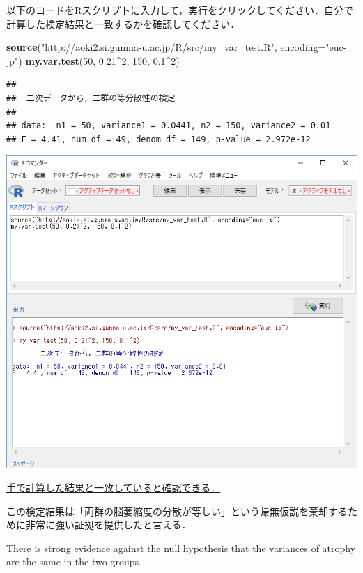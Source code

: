 \documentclass[]{problemset}
\newenvironment{Shaded}{\begin{snugshade}}{\end{snugshade}}
\newcommand{\DataTypeTok}[1]{\textcolor[rgb]{0.13,0.29,0.53}{#1}}
\newcommand{\DecValTok}[1]{\textcolor[rgb]{0.00,0.00,0.81}{#1}}
\newcommand{\FloatTok}[1]{\textcolor[rgb]{0.00,0.00,0.81}{#1}}
\newcommand{\KeywordTok}[1]{\textcolor[rgb]{0.13,0.29,0.53}{\textbf{#1}}}
\newcommand{\NormalTok}[1]{#1}
\newcommand{\OperatorTok}[1]{\textcolor[rgb]{0.81,0.36,0.00}{\textbf{#1}}}
\newcommand{\StringTok}[1]{\textcolor[rgb]{0.31,0.60,0.02}{#1}}
\begin{document}
以下のコードをRスクリプトに入力して，実行をクリックしてください．自分で計算した検定結果と一致するかを確認してください．

\begin{Shaded}
\begin{Highlighting}[]
\KeywordTok{source}\NormalTok{(}\StringTok{"http://aoki2.si.gunma-u.ac.jp/R/src/my_var_test.R"}\NormalTok{, }\DataTypeTok{encoding=}\StringTok{"euc-jp"}\NormalTok{)}
\KeywordTok{my.var.test}\NormalTok{(}\DecValTok{50}\NormalTok{, }\FloatTok{0.21}\OperatorTok{^}\DecValTok{2}\NormalTok{, }\DecValTok{150}\NormalTok{, }\FloatTok{0.1}\OperatorTok{^}\DecValTok{2}\NormalTok{)}
\end{Highlighting}
\end{Shaded}

\begin{verbatim}
## 
##  二次データから，二群の等分散性の検定
## 
## data:  n1 = 50, variance1 = 0.0441, n2 = 150, variance2 = 0.01
## F = 4.41, num df = 49, denom df = 149, p-value = 2.972e-12
\end{verbatim}

\begin{center}\includegraphics[width=0.9\linewidth]{pic/ftest01} \end{center}
\bigskip

\underline{手で計算した結果と一致していると確認できる．}

この検定結果は「両群の脳萎縮度の分散が等しい」という帰無仮説を棄却するために非常に強い証拠を提供したと言える．

There is strong evidence against the null hypothesis that the variances
of atrophy are the same in the two groups.
\end{document}

